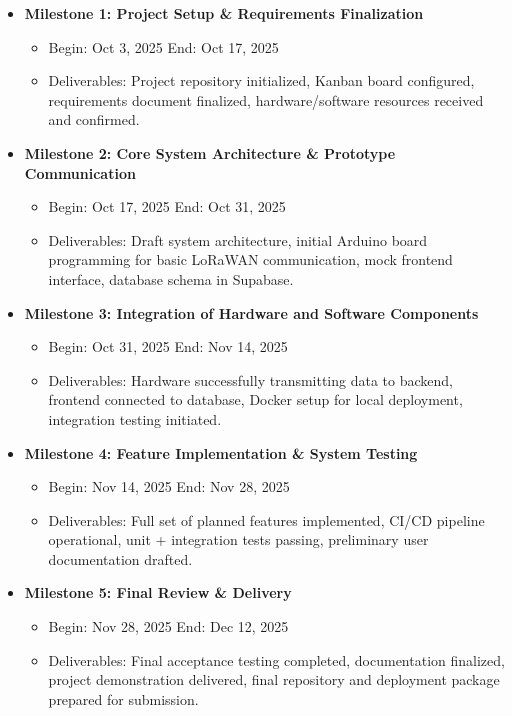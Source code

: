 \begin{itemize}
    \item \textbf{Milestone 1: Project Setup \& Requirements Finalization}  
    \begin{itemize}
        \item Begin: Oct 3, 2025 \quad End: Oct 17, 2025  
        \item Deliverables: Project repository initialized, Kanban board configured, requirements document finalized, hardware/software resources received and confirmed.  
    \end{itemize}

    \item \textbf{Milestone 2: Core System Architecture \& Prototype Communication}  
    \begin{itemize}
        \item Begin: Oct 17, 2025 \quad End: Oct 31, 2025  
        \item Deliverables: Draft system architecture, initial Arduino board programming for basic LoRaWAN communication, mock frontend interface, database schema in Supabase.  
    \end{itemize}

    \item \textbf{Milestone 3: Integration of Hardware and Software Components}  
    \begin{itemize}
        \item Begin: Oct 31, 2025 \quad End: Nov 14, 2025  
        \item Deliverables: Hardware successfully transmitting data to backend, frontend connected to database, Docker setup for local deployment, integration testing initiated.  
    \end{itemize}

    \item \textbf{Milestone 4: Feature Implementation \& System Testing}  
    \begin{itemize}
        \item Begin: Nov 14, 2025 \quad End: Nov 28, 2025  
        \item Deliverables: Full set of planned features implemented, CI/CD pipeline operational, unit + integration tests passing, preliminary user documentation drafted.  
    \end{itemize}

    \item \textbf{Milestone 5: Final Review \& Delivery}  
    \begin{itemize}
        \item Begin: Nov 28, 2025 \quad End: Dec 12, 2025  
        \item Deliverables: Final acceptance testing completed, documentation finalized, project demonstration delivered, final repository and deployment package prepared for submission.  
    \end{itemize}
\end{itemize}

